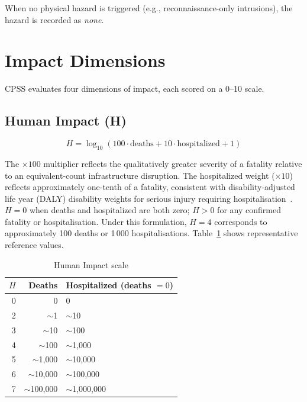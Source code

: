 \documentclass[11pt]{article}
\begin{document}
When no physical hazard is triggered (e.g., reconnaissance-only
intrusions), the hazard is recorded as \emph{none}.

\section{Impact Dimensions}

CPSS evaluates four dimensions of impact, each scored on a 0--10 scale.

\subsection{Human Impact (H)}

\begin{equation}
  H = \log_{10}(100 \cdot \text{deaths} + 10 \cdot \text{hospitalized} + 1)
  \label{eq:H}
\end{equation}

The $\times 100$ multiplier reflects the qualitatively greater severity
of a fatality relative to an equivalent-count infrastructure disruption.
The hospitalized weight ($\times 10$) reflects approximately one-tenth of a
fatality, consistent with disability-adjusted life year (DALY) disability
weights for serious injury requiring hospitalisation~\cite{who_daly}.
$H = 0$ when deaths and hospitalized are both zero; $H > 0$ for any
confirmed fatality or hospitalisation.
Under this formulation, $H = 4$ corresponds to approximately 100 deaths
or 1\,000 hospitalisations.
Table~\ref{tab:H} shows representative reference values.

\begin{table}[htbp]
\centering
\caption{Human Impact scale}
\label{tab:H}
\begin{tabular}{rrl}
\toprule
$H$ & Deaths & Hospitalized (deaths $= 0$) \\
\midrule
0 & 0 & 0 \\
2 & $\sim$1 & $\sim$10 \\
3 & $\sim$10 & $\sim$100 \\
4 & $\sim$100 & $\sim$1{,}000 \\
5 & $\sim$1{,}000 & $\sim$10{,}000 \\
6 & $\sim$10{,}000 & $\sim$100{,}000 \\
7 & $\sim$100{,}000 & $\sim$1{,}000{,}000 \\
\bottomrule
\end{tabular}
\end{table}
\end{document}
